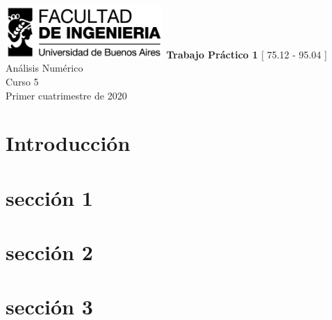 \documentclass[titlepage,a4paper]{article}
\begin{document}
\begin{titlepage} %
	\hfill\includegraphics[width=6cm]{logofiuba.jpg}
    \centering
    \vfill
    \Huge \textbf{Trabajo Práctico 1}
    \vskip2cm
    \Large [ 75.12 - 95.04 ] Análisis Numérico\\
    Curso 5 \\ 
    Primer cuatrimestre de 2020 
    \vfill
    \vfill
    \vfill
\end{titlepage}

\tableofcontents %


\section{Introducción}\label{sec:intro}



\section{sección 1}\label{sec:sección 1}


\section{sección 2}\label{sec:sección 2}

\section{sección 3}\label{sec:sección 3}
\end{document}
